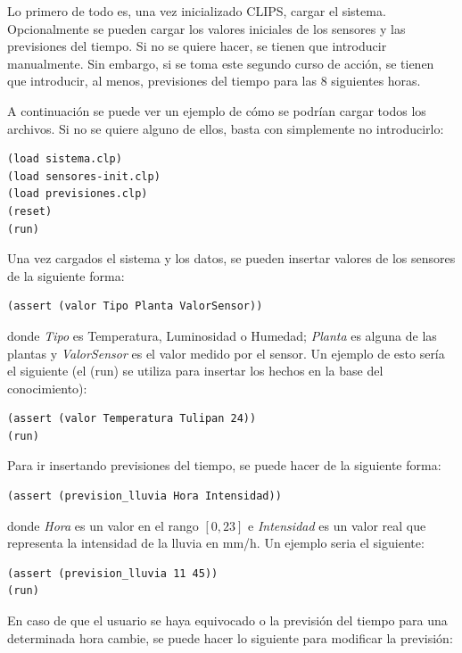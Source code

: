 \documentclass[11pt,a4paper]{article}
\begin{document}
Lo primero de todo es, una vez inicializado CLIPS, cargar el sistema. Opcionalmente se pueden cargar los valores iniciales de
los sensores y las previsiones del tiempo. Si no se quiere hacer, se tienen que introducir manualmente. Sin embargo, si se toma
este segundo curso de acción, se tienen que introducir, al menos, previsiones del tiempo para las 8 siguientes horas.

A continuación se puede ver un ejemplo de cómo se podrían cargar todos los archivos. Si no se quiere alguno de ellos, basta con
simplemente no introducirlo:

\begin{lstlisting}
(load sistema.clp)
(load sensores-init.clp)
(load previsiones.clp)
(reset)
(run)
\end{lstlisting}

Una vez cargados el sistema y los datos, se pueden insertar valores de los sensores de la siguiente forma:

\begin{lstlisting}
(assert (valor Tipo Planta ValorSensor))
\end{lstlisting}

\noindent donde \textit{Tipo} es Temperatura, Luminosidad o Humedad; \textit{Planta} es alguna de las plantas y \textit{ValorSensor}
es el valor medido por el sensor. Un ejemplo de esto sería el siguiente (el (run) se utiliza para insertar los hechos en la base
del conocimiento):

\begin{lstlisting}
(assert (valor Temperatura Tulipan 24))
(run)
\end{lstlisting}

Para ir insertando previsiones del tiempo, se puede hacer de la siguiente forma:

\begin{lstlisting}
(assert (prevision_lluvia Hora Intensidad))
\end{lstlisting}

\noindent donde \textit{Hora} es un valor en el rango $[0, 23]$ e \textit{Intensidad} es un valor real que representa la intensidad
de la lluvia en mm/h. Un ejemplo seria el siguiente:

\begin{lstlisting}
(assert (prevision_lluvia 11 45))
(run)
\end{lstlisting}

En caso de que el usuario se haya equivocado o la previsión del tiempo para una determinada hora cambie, se puede hacer lo siguiente
para modificar la previsión:
\end{document}
